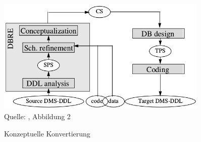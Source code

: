 \begin{figure}[h!]
	\centering
	\caption{Konzeptuelle Konvertierung}
	\label{pic:conversion_conceptual}
	\includegraphics[width=0.9\textwidth]{../images/strategies_fig_02b.png} \\
	\tiny Quelle: \citep{henrard-2002}, Abbildung 2
\end{figure}


